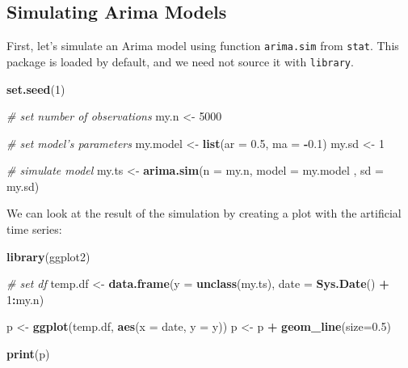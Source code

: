 \documentclass[11pt,]{book}
\newenvironment{Shaded}{\begin{snugshade}}{\end{snugshade}}
\newcommand{\KeywordTok}[1]{\textcolor[rgb]{0.27,0.27,0.27}{\textbf{#1}}}
\newcommand{\DataTypeTok}[1]{\textcolor[rgb]{0.27,0.27,0.27}{#1}}
\newcommand{\DecValTok}[1]{\textcolor[rgb]{0.06,0.06,0.06}{#1}}
\newcommand{\FloatTok}[1]{\textcolor[rgb]{0.06,0.06,0.06}{#1}}
\newcommand{\StringTok}[1]{\textcolor[rgb]{0.5,0.5,0.5}{#1}}
\newcommand{\CommentTok}[1]{\textcolor[rgb]{0.56,0.35,0.01}{\textit{#1}}}
\newcommand{\OperatorTok}[1]{\textcolor[rgb]{0.81,0.36,0.00}{\textbf{#1}}}
\newcommand{\NormalTok}[1]{#1}
\begin{document}
\subsection{Simulating Arima Models}\label{simulating-arima-models}

First, let's simulate an Arima model using function \texttt{arima.sim}
from \texttt{stat}. This package is loaded by default, and we need not
source it with \texttt{library}. 

\begin{Shaded}
\begin{Highlighting}[]
\KeywordTok{set.seed}\NormalTok{(}\DecValTok{1}\NormalTok{)}

\CommentTok{# set number of observations}
\NormalTok{my.n <-}\StringTok{ }\DecValTok{5000}

\CommentTok{# set model's parameters}
\NormalTok{my.model <-}\StringTok{ }\KeywordTok{list}\NormalTok{(}\DataTypeTok{ar =} \FloatTok{0.5}\NormalTok{, }\DataTypeTok{ma =} \OperatorTok{-}\FloatTok{0.1}\NormalTok{)}
\NormalTok{my.sd <-}\StringTok{ }\DecValTok{1}

\CommentTok{# simulate model}
\NormalTok{my.ts <-}\StringTok{ }\KeywordTok{arima.sim}\NormalTok{(}\DataTypeTok{n =}\NormalTok{ my.n, }
                   \DataTypeTok{model =}\NormalTok{ my.model , }
                   \DataTypeTok{sd =}\NormalTok{ my.sd)}
\end{Highlighting}
\end{Shaded}

We can look at the result of the simulation by creating a plot with the
artificial time series:

\begin{Shaded}
\begin{Highlighting}[]
\KeywordTok{library}\NormalTok{(ggplot2)}

\CommentTok{# set df}
\NormalTok{temp.df <-}\StringTok{ }\KeywordTok{data.frame}\NormalTok{(}\DataTypeTok{y =} \KeywordTok{unclass}\NormalTok{(my.ts), }
                      \DataTypeTok{date =} \KeywordTok{Sys.Date}\NormalTok{() }\OperatorTok{+}\StringTok{ }\DecValTok{1}\OperatorTok{:}\NormalTok{my.n)}

\NormalTok{p <-}\StringTok{ }\KeywordTok{ggplot}\NormalTok{(temp.df, }\KeywordTok{aes}\NormalTok{(}\DataTypeTok{x =}\NormalTok{ date, }\DataTypeTok{y =}\NormalTok{ y))}
\NormalTok{p <-}\StringTok{ }\NormalTok{p }\OperatorTok{+}\StringTok{ }\KeywordTok{geom_line}\NormalTok{(}\DataTypeTok{size=}\FloatTok{0.5}\NormalTok{)}

\KeywordTok{print}\NormalTok{(p)}
\end{Highlighting}
\end{Shaded}
\end{document}
